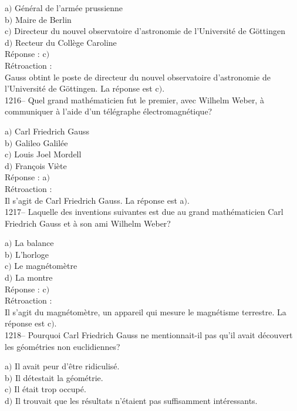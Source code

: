 ﻿\documentclass[letterpaper, 12pt]{article}
\begin{document}
a$)$ G\'en\'eral de l'arm\'ee prussienne \\
b$)$ Maire de Berlin \\
c$)$ Directeur du nouvel observatoire d'astronomie de l'Universit\'e de
G\"ottingen \\
d$)$ Recteur du Coll\`ege Caroline\\

R\'eponse : c$)$\\

R\'etroaction : \\
Gauss obtint le poste de directeur du nouvel observatoire
d'astronomie de l'Universit\'e de G\"ottingen.
La r\'eponse est c$)$.\\

1216-- Quel grand math\'ematicien fut le premier, avec Wilhelm
Weber, \`a communiquer \`a l'aide d'un t\'el\'egraphe
\'electromagn\'etique?

a$)$ Carl Friedrich Gauss \\
b$)$ Galileo Galil\'ee \\
c$)$ Louis Joel Mordell \\
d$)$ Fran\c cois Vi\`ete\\

R\'eponse : a$)$\\

R\'etroaction : \\
Il s'agit de Carl Friedrich Gauss.
La r\'eponse est a$)$.\\

1217-- Laquelle des inventions suivantes est due au grand
math\'ematicien Carl Friedrich Gauss et \`a son ami Wilhelm Weber?

a$)$ La balance \\
b$)$ L'horloge \\
c$)$ Le magn\'etom\`etre \\
d$)$ La montre\\

R\'eponse : c$)$\\

R\'etroaction : \\
Il s'agit du magn\'etom\`etre, un appareil qui mesure le
magn\'etisme terrestre.
La r\'eponse est c$)$.\\

1218-- Pourquoi Carl Friedrich Gauss ne mentionnait-il pas qu'il
avait d\'ecouvert les g\'eom\'etries non euclidiennes?

a$)$ Il avait peur d'\^etre ridiculis\'e. \\
b$)$ Il d\'etestait la g\'eom\'etrie. \\
c$)$ Il \'etait trop occup\'e. \\
d$)$ Il trouvait que les r\'esultats n'\'etaient pas suffisamment
int\'eressants.\\
\end{document}
